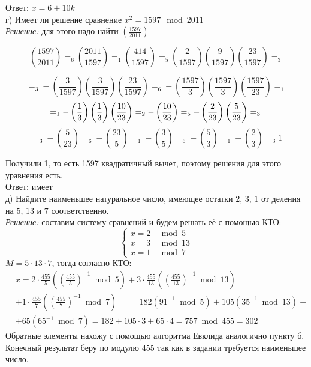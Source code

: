 \documentclass[a4paper,12pt]{article} %
\begin{document}
Ответ: $ x = 6 + 10k$\\

г) Имеет ли решение сравнение $x^2 = 1597 \mod 2011$\\

\textit{Решение:}  для этого надо найти $ \left(\frac{1597}{2011}\right) $

$$
\left(\frac{1597}{2011}\right)=_6\left(\frac{2011}{1597}\right)=_1\left(\frac{414}{1597}\right)=_5\left(\frac{2}{1597}\right)\left(\frac{9}{1597}\right)\left(\frac{23}{1597}\right)=_3 
$$

$$
=_3-\left(\frac{3}{1597}\right)\left(\frac{3}{1597}\right)\left(\frac{23}{1597}\right)=_6-\left(\frac{1597}{3}\right)\left(\frac{1597}{3}\right)\left(\frac{1597}{23}\right)=_1 
$$
$$
=_{1}-\left(\frac{1}{3}\right)\left(\frac{1}{3}\right)\left(\frac{10}{23}\right)=_2-\left(\frac{10}{23}\right)=_5-\left(\frac{2}{23}\right)\left(\frac{5}{23}\right)=_3 \\
$$
$$
=_3-\left(\frac{5}{23}\right)=_6-\left(\frac{23}{5}\right)=_1-\left(\frac{3}{5}\right)=_6-\left(\frac{5}{3}\right)=_1-\left(\frac{2}{3}\right)=_3 1
$$

Получили 1, то есть 1597 квадратичный вычет, поэтому решения для этого уравнения есть.\\
Ответ: имеет \\

д) Найдите наименьшее натуральное число, имеющее остатки $2$, $3$, $1$ от деления на $5$, $13$ и $7$ соответственно. \smallskip \\

\textit{Решение:} составим систему сравнений и будем решать её с помощью КТО:\\
$$
\left\{\begin{array}{ll}
x=2 & \bmod 5 \\
x=3 & \bmod 13 \\
x=1 & \bmod 7
\end{array}\right.
$$
$ M = 5 \cdot 13 \cdot 7 $, тогда согласно КТО:\\
$$
\begin{aligned}
&x=2 \cdot \frac{455}{5}\left(\left(\frac{455}{5}\right)^{-1} \bmod 5\right)+3 \cdot \frac{455}{13}\left(\left(\frac{455}{13}\right)^{-1} \bmod 13\right)\\
&+1 \cdot \frac{455}{7}\left(\left(\frac{455}{7}\right)^{-1} \bmod 7\right)=
=182 (91^{-1} \bmod 5)+105\left(35^{-1} \bmod 13\right)+ \\
&+65\left(65^{-1} \bmod 7\right)=182+105 \cdot 3+65 \cdot 4 = 757 \bmod 455 = 302
\end{aligned}
$$
Обратные элементы нахожу с помощью алгоритма Евклида аналогично пункту б. Конечный результат беру по модулю 455 так как в задании требуется наименьшее число.\\
\end{document}
